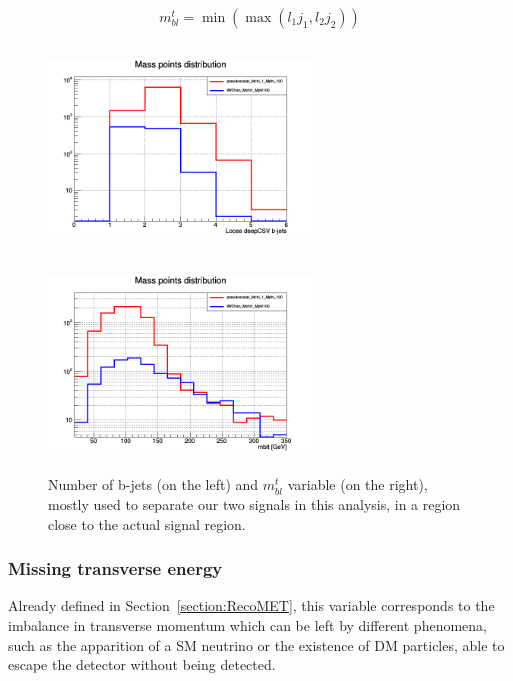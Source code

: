 \documentclass[a4paper, 10pt, openright]{report}
\begin{document}
\begin{equation}
\label{eq:mblt}
m_{bl}^t = \min \left (\max(l_1 j_1, l_2 j_2) \right)
\end{equation}

\begin{figure}[htbp]
\centering
\begin{minipage}[b]{.48\textwidth}
\includegraphics[width=7cm, height=5.6cm]{figs/nbJet.png}
\end{minipage}\hfill
\begin{minipage}[b]{.48\textwidth}
\includegraphics[width=7cm, height=5.6cm]{figs/mblt.png}
\end{minipage} \hfill
\caption{Number of b-jets (on the left) and $m_{bl}^t$ variable (on the right), mostly used to separate our two signals in this analysis, in a region close to the actual signal region.}
\label{fig:signalsDiscrimination}
\end{figure}

\subsubsection*{Missing transverse energy}

Already defined in Section~\ref{section:RecoMET}, this variable corresponds to the imbalance in transverse momentum which can be left by different phenomena, such as the apparition of a \ac{SM} neutrino or the existence of \ac{DM} particles, able to escape the detector without being detected.
\end{document}
